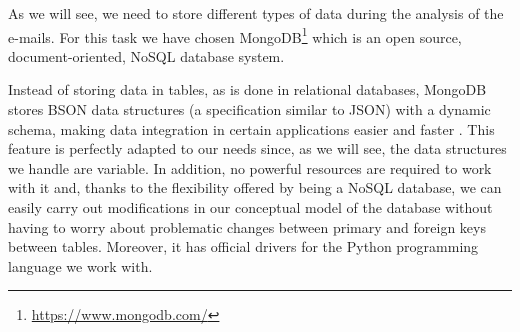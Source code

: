 As we will see, we need to store different types of data during the analysis of the e-mails. For this task we have chosen MongoDB\footnote{\url{https://www.mongodb.com/}} which is an open source, document-oriented, NoSQL database system.

Instead of storing data in tables, as is done in relational databases, MongoDB stores BSON data structures (a specification similar to JSON) with a dynamic schema, making data integration in certain applications easier and faster \citep{gyHorodi2015comparative}. This feature is perfectly adapted to our needs since, as we will see, the data structures we handle are variable. In addition, no powerful resources are required to work with it and, thanks to the flexibility offered by being a NoSQL database, we can easily carry out modifications in our conceptual model of the database without having to worry about problematic changes between primary and foreign keys between tables. Moreover, it has official drivers for the Python programming language we work with.